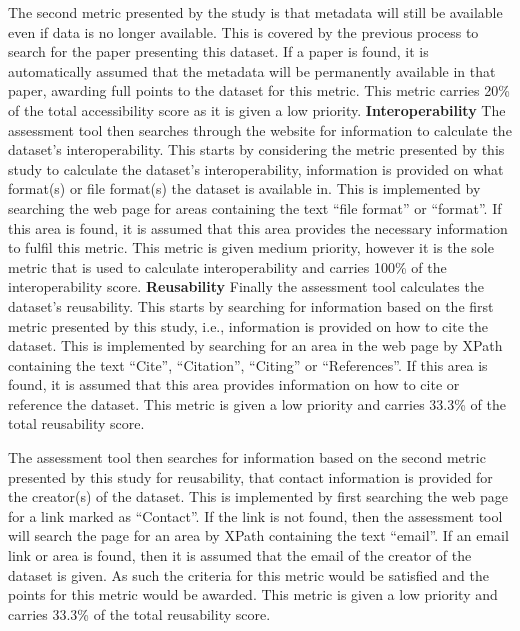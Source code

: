 \documentclass{cisfyp}
\begin{document}
The second metric presented by the study is that metadata will still be available even if data is no longer available. This is covered by the previous process to search for the paper presenting this dataset. If a paper is found, it is automatically assumed that the metadata will be permanently available in that paper, awarding full points to the dataset for this metric. This metric carries 20\% of the total accessibility score as it is given a low priority.\newline
\textbf{Interoperability}\newline
The assessment tool then searches through the website for information to calculate the dataset's interoperability. This starts by considering the metric presented by this study to calculate the dataset's interoperability, information is provided on what format(s) or file format(s) the dataset is available in. This is implemented by searching the web page for areas containing the text ``file format'' or ``format''. If this area is found, it is assumed that this area provides the necessary information to fulfil this metric. This metric is given medium priority, however it is the sole metric that is used to calculate interoperability and carries 100\% of the interoperability score.\newline
\textbf{Reusability}\newline
Finally the assessment tool calculates the dataset's reusability. This starts by searching for information based on the first metric presented by this study, i.e., information is provided on how to cite the dataset. This is implemented by searching for an area in the web page by XPath containing the text ``Cite'', ``Citation'', ``Citing'' or ``References''. If this area is found, it is assumed that this area provides information on how to cite or reference the dataset. This metric is given a low priority and carries 33.3\% of the total reusability score. 

The assessment tool then searches for information based on the second metric presented by this study for reusability, that contact information is provided for the creator(s) of the dataset. This is implemented by first searching the web page for a link marked as ``Contact''. If the link is not found, then the assessment tool will search the page for an area by XPath containing the text ``email''. If an email link or area is found, then it is assumed that the email of the creator of the dataset is given. As such the criteria for this metric would be satisfied and the points for this metric would be awarded. This metric is given a low priority and carries 33.3\% of the total reusability score.
\end{document}
